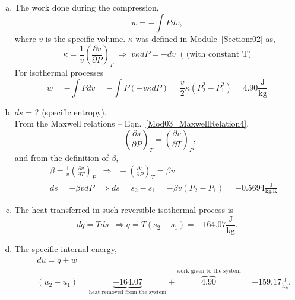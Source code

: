 \documentclass[12pts,a4paper,amsmath,amssymb,floatfix]{article}%
\newcommand{\frc}{\displaystyle\frac}
\begin{document}
\begin{enumerate}[1)]
       \begin{enumerate}[a)]
%
            \item The work done during the compression,
                \begin{displaymath}
                   w = -\int P dv,
                \end{displaymath}
                where $v$ is the specific volume. $\kappa$ was defined in Module~\ref{Section:02} as,
                \begin{displaymath}
                   \kappa = \frc{1}{v}\left(\frc{\partial v}{\partial P}\right)_{T}\;\Longrightarrow \; v\kappa dP = - dv \;\;\text{( (with constant T)}
                \end{displaymath}
                For isothermal processes
                \begin{displaymath}
                   w = -\int P dv = - \int P\left(-v\kappa dP\right) = \frc{v}{2}\kappa\left(P_{2}^{2}-P_{1}^{2}\right) = 4.90 \frc{\text{J}}{\text{kg}}
                \end{displaymath}
%
            \item $ds$ = ? (specific entropy).\\
                  From the Maxwell relations -- Eqn.~\ref{Mod03_MaxwellRelation4}, 
                \begin{displaymath}
                   -\left(\frc{\partial s}{\partial P}\right)_{T} = \left(\frc{\partial v}{\partial T}\right)_{P},
                \end{displaymath}
                and from the definition of $\beta$,
                \begin{eqnarray}
                    && \beta = \frc{1}{v}\left(\frc{\partial v}{\partial T}\right)_{P} \;\;\Longrightarrow\;\; -\left(\frc{\partial s}{\partial P}\right)_{T} = \beta v \nonumber \\
                    && ds = -\beta v dP \;\;\Longrightarrow ds = s_{2}-s_{1} = -\beta v \left(P_{2}-P_{1}\right) = -0.5694 \frc{\text{J}}{\text{kg.K}} \nonumber
                \end{eqnarray}
%
            \item The heat transferred in such reversible isothermal process is
                \begin{displaymath}
                   dq = Tds \;\;\Longrightarrow q = T\left(s_{2}-s_{1}\right) = -164.07 \frc{\text{J}}{\text{kg}}.
                \end{displaymath}
%
            \item The specific internal energy,
                \begin{eqnarray}
                   &&  du = q + w \nonumber \\
                   && \left(u_{2}-u_{1}\right) = \underbrace{-164.07}_{\text{heat removed from the system}} + \overbrace{4.90}^{\text{work given to the system}} = -159.17 \frc{\text{J}}{\text{kg}}. \nonumber
                \end{eqnarray}
 

\end{enumerate}
\end{enumerate}
\end{document}
